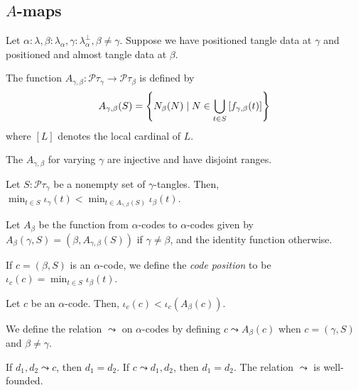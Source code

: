 \documentclass{article}
\begin{document}
\subsection{\( A \)-maps}

Let \( \alpha : \lambda, \beta : \lambda_\alpha, \gamma : \lambda^\bot_\alpha, \beta \neq \gamma \).
Suppose we have positioned tangle data at \( \gamma \) and positioned and almost tangle data at \( \beta \).
\begin{definition}
    The function \( A_{\gamma,\beta} \colon \mathcal P \tau_\gamma \to \mathcal P \tau_\beta \) is defined by
    \[ A_{\gamma,\beta}(S) = \qty{N_\beta(N) \mid N \in \bigcup_{t \in S} \qty[f_{\gamma,\beta}(t)]} \]
    where \( [L] \) denotes the local cardinal of \( L \).
\end{definition}
\begin{lemma}
    The \( A_{\gamma,\beta} \) for varying \( \gamma \) are injective and have disjoint ranges.
\end{lemma}
\begin{lemma}
    Let \( S : \mathcal P \tau_\gamma \) be a nonempty set of \( \gamma \)-tangles.
    Then, \( \min_{t \in S} \iota_\gamma(t) < \min_{t \in A_{\gamma,\beta}(S)} \iota_\beta(t) \).
\end{lemma}
\begin{definition}
    Let \( A_\beta \) be the function from \( \alpha \)-codes to \( \alpha \)-codes given by \( A_\beta(\gamma, S) = (\beta, A_{\gamma,\beta}(S)) \) if \( \gamma \neq \beta \), and the identity function otherwise.
\end{definition}
\begin{definition}
    If \( c = (\beta, S) \) is an \( \alpha \)-code, we define the \emph{code position} to be \( \iota_c(c) = \min_{t \in S} \iota_\beta(t) \).
\end{definition}
\begin{lemma}
    Let \( c \) be an \( \alpha \)-code.
    Then, \( \iota_c(c) < \iota_c(A_\beta(c)) \).
\end{lemma}
\begin{definition}
    We define the relation \( \leadsto \) on \( \alpha \)-codes by defining \( c \leadsto A_\beta(c) \) when \( c = (\gamma, S)\) and \( \beta \neq \gamma \).
\end{definition}
\begin{lemma}
    If \( d_1, d_2 \leadsto c \), then \( d_1 = d_2 \).
    If \( c \leadsto d_1, d_2 \), then \( d_1 = d_2 \).
    The relation \( \leadsto \) is well-founded.
\end{lemma}
\end{document}
